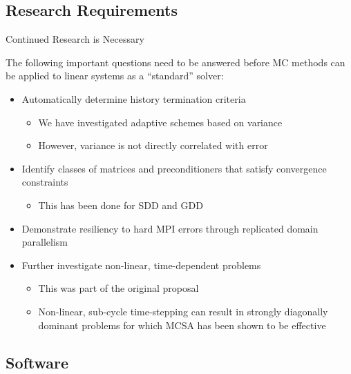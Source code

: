 \documentclass{beamer}
\begin{document}
\subsection{Research Requirements}

\begin{frame}{Continued Research is Necessary}

  The following important questions need to be answered before MC methods can
  be applied to linear systems as a ``standard'' solver:

  \begin{itemize}
  \item Automatically determine history termination criteria
    \begin{itemize}
    \item We have investigated adaptive schemes based on variance
    \item However, variance is not directly correlated with error
    \end{itemize}
  \item Identify classes of matrices and preconditioners that satisfy
    convergence constraints
    \begin{itemize}
    \item This has been done for SDD and GDD
    \end{itemize}
  \item Demonstrate resiliency to hard MPI errors through replicated domain
    parallelism
  \item Further investigate non-linear, time-dependent problems
    \begin{itemize}
    \item This was part of the original proposal
    \item Non-linear, sub-cycle time-stepping can result in strongly diagonally
      dominant problems for which MCSA has been shown to be effective
    \end{itemize}
  \end{itemize}
\end{frame}

\subsection{Software}
\end{document}
